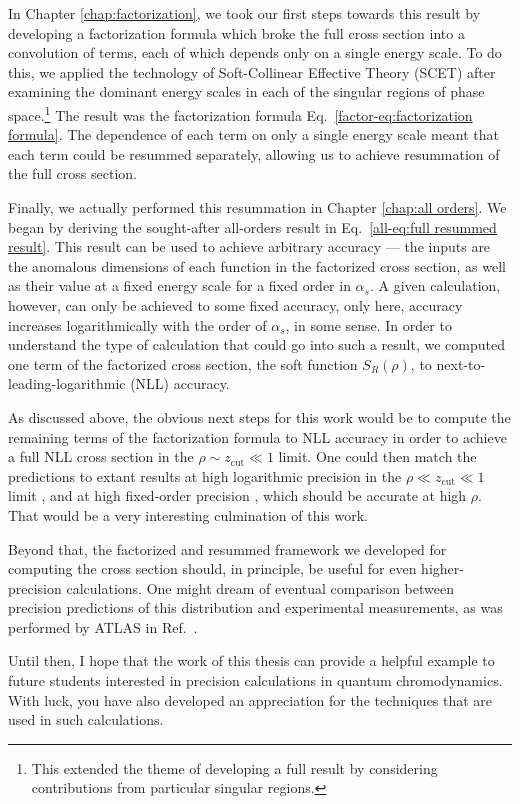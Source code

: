 \documentclass[../thesis.tex]{subfiles}
\providecommand{\zcut}{z_\mathrm{{cut}}}
\begin{document}
	In Chapter \ref{chap:factorization}, we took our first steps towards this result by developing a factorization formula which broke the full cross section into a convolution of terms, each of which depends only on a single energy scale. To do this, we applied the technology of Soft-Collinear Effective Theory (SCET) after examining the dominant energy scales in each of the singular regions of phase space.\footnote{This extended the theme of developing a full result by considering contributions from particular singular regions.} The result was the factorization formula Eq.~\ref{factor-eq:factorization formula}. The dependence of each term on only a single energy scale meant that each term could be resummed separately, allowing us to achieve resummation of the full cross section.

	Finally, we actually performed this resummation in Chapter \ref{chap:all orders}. We began by deriving the sought-after all-orders result in Eq.~\ref{all-eq:full resummed result}. This result can be used to achieve arbitrary accuracy --- the inputs are the anomalous dimensions of each function in the factorized cross section, as well as their value at a fixed energy scale for a fixed order in $\alpha_s$. A given calculation, however, can only be achieved to some fixed accuracy, only here, accuracy increases logarithmically with the order of $\alpha_s$, in some sense. In order to understand the type of calculation that could go into such a result, we computed one term of the factorized cross section, the soft function $S_R(\rho)$, to next-to-leading-logarithmic (NLL) accuracy.

	As discussed above, the obvious next steps for this work would be to compute the remaining terms of the factorization formula to NLL accuracy in order to achieve a full NLL cross section in the $\rho \sim \zcut \ll 1$ limit. One could then match the predictions to extant results at high logarithmic precision in the $\rho \ll \zcut \ll 1$ limit \cite{frye_factorization_2016,kardos_groomed_2020,kardos_two-_2020}, and at high fixed-order precision \cite{kardos_soft-drop_2018}, which should be accurate at high $\rho$. That would be a very interesting culmination of this work.

	Beyond that, the factorized and resummed framework we developed for computing the cross section should, in principle, be useful for even higher-precision calculations. One might dream of eventual comparison between precision predictions of this distribution and experimental measurements, as was performed by ATLAS in Ref.~\cite{atlas_collaboration_measurement_2020-1}.

	Until then, I hope that the work of this thesis can provide a helpful example to future students interested in precision calculations in quantum chromodynamics. With luck, you have also developed an appreciation for the techniques that are used in such calculations.


%  
% 
\end{document}

